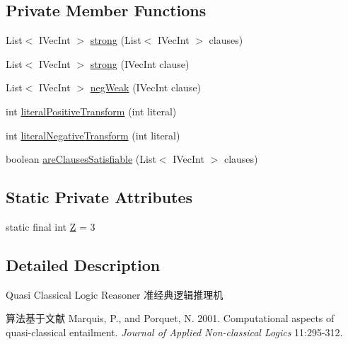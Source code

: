 \subsection*{Private Member Functions}
\begin{DoxyCompactItemize}
\item 
List$<$ IVecInt $>$ \hyperlink{classedu_1_1pku_1_1id_1_1_q_c_reasoner_v2_a2287ecfa0c316caad00288a00d99a53d}{strong} (List$<$ IVecInt $>$ clauses)
\item 
List$<$ IVecInt $>$ \hyperlink{classedu_1_1pku_1_1id_1_1_q_c_reasoner_v2_a58d1acccb28e5b185e6af32958deff3b}{strong} (IVecInt clause)
\item 
List$<$ IVecInt $>$ \hyperlink{classedu_1_1pku_1_1id_1_1_q_c_reasoner_v2_a9fcf948861f95fc5bf1451c22737fb46}{negWeak} (IVecInt clause)
\item 
int \hyperlink{classedu_1_1pku_1_1id_1_1_q_c_reasoner_v2_a1523c6684bc8b1cf7267a5f86413d481}{literalPositiveTransform} (int literal)
\item 
int \hyperlink{classedu_1_1pku_1_1id_1_1_q_c_reasoner_v2_a965973948f1b741cca0a01010b8210d0}{literalNegativeTransform} (int literal)
\item 
boolean \hyperlink{classedu_1_1pku_1_1id_1_1_q_c_reasoner_v2_abe75137424ee56f6c3ffe02c6d3ef137}{areClausesSatisfiable} (List$<$ IVecInt $>$ clauses)
\end{DoxyCompactItemize}
\subsection*{Static Private Attributes}
\begin{DoxyCompactItemize}
\item 
static final int \hyperlink{classedu_1_1pku_1_1id_1_1_q_c_reasoner_v2_af2c8bff8769fa861fbb3d224d8fdf7c3}{Z} = 3
\end{DoxyCompactItemize}


\subsection{Detailed Description}
Quasi Classical Logic Reasoner 准经典逻辑推理机 \par
 算法基于文献 Marquis, P., and Porquet, N. 2001. Computational aspects of quasi-\/classical entailment. {\itshape Journal of Applied Non-\/classical Logics\/} 11:295-\/312. \par
 

